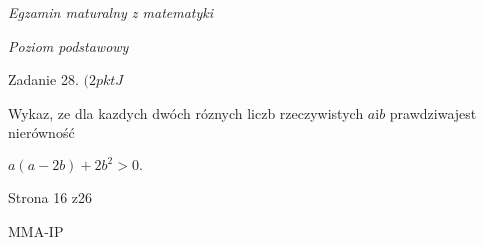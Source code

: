\documentclass[a4paper,12pt]{article}
\begin{document}
{\it Egzamin maturalny z matematyki}

{\it Poziom podstawowy}

Zadanie 28. $(2pktJ$

Wykaz, ze dla kazdych dwóch róznych liczb rzeczywistych $a\mathrm{i}b$ prawdziwajest nierówność

$a(a-2b)+2b^{2}>0.$

Strona 16 z26

MMA-IP
\end{document}
